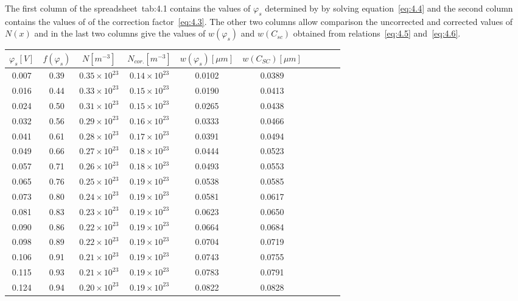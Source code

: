 The first column of the spreadsheet~{tab:4.1} contains the values of
$\varphi_{s}$ determined by by solving equation~\ref{eq:4.4} and the
second column contains the values of of the correction
factor~\ref{eq:4.3}. The other two columns allow comparison the
uncorrected and corrected values of $N(x)$ and in the last two columns
give the values of $w(\varphi_{s})$ and $w(C_{sc})$ obtained from
relations~\ref{eq:4.5} and~\ref{eq:4.6}.

\begin{table}[h!]\centering
  \begin{tabular}{c c c c c c c c c c}
    $\varphi_{s}[V]$ & $f(\varphi_{s})$ & $N[m^{-3}]$ & $N_{cor.}[m^{-3}]$ & $w(\varphi_{s})[\mu m]$ & $w(C_{SC})[\mu m]$ \\
    \hline%
    0.007 & 0.39 & $0.35\times10^{23}$ & $0.14\times10^{23}$ & 0.0102 & 0.0389 \\
    0.016 & 0.44 & $0.33\times10^{23}$ & $0.15\times10^{23}$ & 0.0190 & 0.0413 \\
    0.024 & 0.50 & $0.31\times10^{23}$ & $0.15\times10^{23}$ & 0.0265 & 0.0438 \\
    0.032 & 0.56 & $0.29\times10^{23}$ & $0.16\times10^{23}$ & 0.0333 & 0.0466 \\
    0.041 & 0.61 & $0.28\times10^{23}$ & $0.17\times10^{23}$ & 0.0391 & 0.0494 \\
    0.049 & 0.66 & $0.27\times10^{23}$ & $0.18\times10^{23}$ & 0.0444 & 0.0523 \\
    0.057 & 0.71 & $0.26\times10^{23}$ & $0.18\times10^{23}$ & 0.0493 & 0.0553 \\
    0.065 & 0.76 & $0.25\times10^{23}$ & $0.19\times10^{23}$ & 0.0538 & 0.0585 \\
    0.073 & 0.80 & $0.24\times10^{23}$ & $0.19\times10^{23}$ & 0.0581 & 0.0617 \\
    0.081 & 0.83 & $0.23\times10^{23}$ & $0.19\times10^{23}$ & 0.0623 & 0.0650 \\
    0.090 & 0.86 & $0.22\times10^{23}$ & $0.19\times10^{23}$ & 0.0664 & 0.0684 \\
    0.098 & 0.89 & $0.22\times10^{23}$ & $0.19\times10^{23}$ & 0.0704 & 0.0719 \\
    0.106 & 0.91 & $0.21\times10^{23}$ & $0.19\times10^{23}$ & 0.0743 & 0.0755 \\
    0.115 & 0.93 & $0.21\times10^{23}$ & $0.19\times10^{23}$ & 0.0783 & 0.0791 \\
    0.124 & 0.94 & $0.20\times10^{23}$ & $0.19\times10^{23}$ & 0.0822 & 0.0828 \\

\end{tabular}
\end{table}
